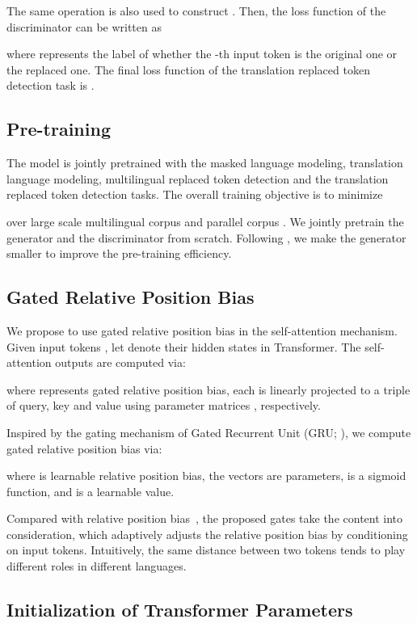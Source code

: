 \documentclass[11pt]{article}
\newcommand\our{\makebox{\textsc{XLM-E}}}
\begin{document}
The same operation is also used to construct . Then, the loss function of the discriminator  can be written as

where  represents the label of whether the -th input token is the original one or the replaced one. The final loss function of the translation replaced token detection task is .

\subsection{Pre-training \our{}}

The \our{} model is jointly pretrained with the masked language modeling, translation language modeling, multilingual replaced token detection and the translation replaced token detection tasks. The overall training objective is to minimize

over large scale multilingual corpus  and parallel corpus .
We jointly pretrain the generator and the discriminator from scratch.
Following \citet{electra}, we make the generator smaller to improve the pre-training efficiency. 

\subsection{Gated Relative Position Bias}
\label{sec:grep}

We propose to use gated relative position bias in the self-attention mechanism.
Given input tokens , let  denote their hidden states in Transformer.
The self-attention outputs  are computed via:

where  represents gated relative position bias, each  is linearly projected to a triple of query, key and value using parameter matrices , respectively.

Inspired by the gating mechanism of Gated Recurrent Unit (GRU; \citealt{gru}), we compute gated relative position bias  via:

where  is learnable relative position bias, the vectors  are parameters,  is a sigmoid function, and  is a learnable value.

Compared with relative position bias~\cite{parikh-etal-2016-decomposable,t5,unilmv2}, the proposed gates take the content into consideration, which adaptively adjusts the relative position bias by conditioning on input tokens.
Intuitively, the same distance between two tokens tends to play different roles in different languages.


\subsection{Initialization of Transformer Parameters}
\label{sec:init}
\end{document}
